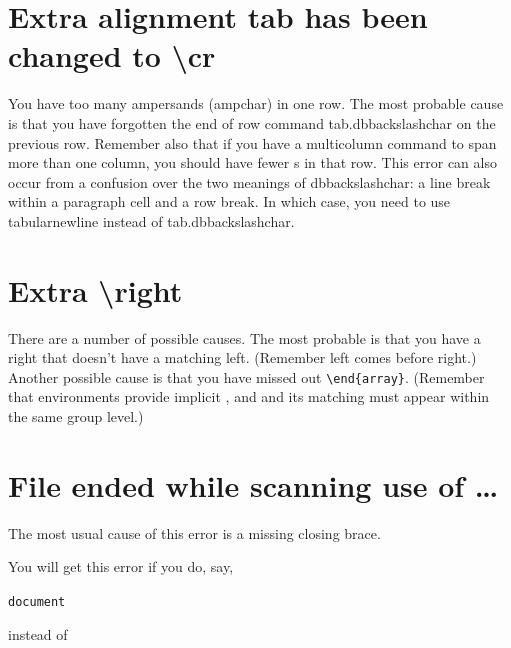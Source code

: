 
\section{Extra alignment tab has been changed to \textbackslash cr}

You have too many ampersands (\gls{ampchar}) in one row.  The most 
probable cause is that you have forgotten the end of row command
\gls{tab.dbbackslashchar} on the previous row.  Remember also that if you have a
\gls{multicolumn} command to span more than one column, you
should have fewer s in that row. This error can also occur
from a confusion over the two meanings of \gls{dbbackslashchar}: a
line break within a paragraph cell and a row break.  In which case,
you need to use \gls{tabularnewline} instead of
\gls{tab.dbbackslashchar}.


\section{Extra \textbackslash right}

There are a number of possible causes.  The most probable is that you
have a \gls{right} that doesn't have a matching \gls{left}.
(Remember left comes before right.)  Another possible cause is that
you have missed out \verb|\end{array}|.  (Remember that
\glspl{environment} provide implicit
, and  and its matching
 must appear within the same group level.)


\section{File ended while scanning use of \texorpdfstring{\ldots}{...}}

The most usual cause of this error is a missing closing brace.

You will get this error if you do, say,
\begin{alltt}\wrong
{}document
\end{alltt}
instead of
\begin{alltt}\correct
{}
\end{alltt}


